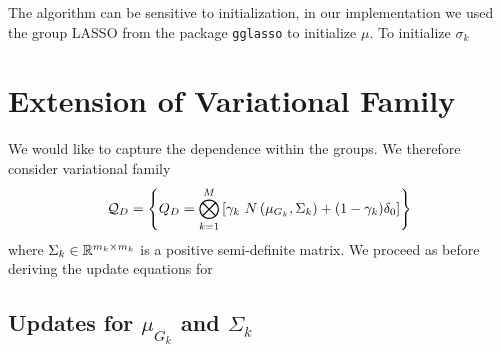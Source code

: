 \documentclass[12pt]{article}
\begin{document}
The algorithm can be sensitive to initialization, in our implementation we used the group LASSO from the package \texttt{gglasso} to initialize $\mu$. To initialize $\sigma_k$ 

\section{Extension of Variational Family}

We would like to capture the dependence within the groups. We therefore consider variational family
\begin{equation}
    \mathcal{Q}_D = \left\{ Q_D =  \bigotimes_{k=1}^M \left[ 
    \gamma_k\ N\left(\mu_{G_k}, \Sigma_k \right) + (1-\gamma_k) \delta_0 \right] \right\}
\end{equation}
where $\Sigma_k \in \mathbb{R}^{m_k \times m_k}$ is a positive semi-definite matrix. We proceed as before deriving the update equations for 

\subsection{Updates for $\mu_{G_k}$ and $\Sigma_{k}$}
\end{document}
